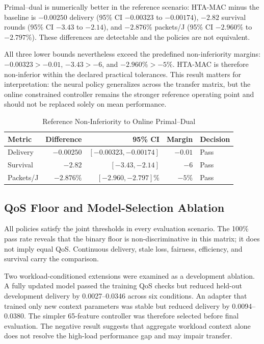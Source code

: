 \documentclass[journal]{IEEEtran}
\newcommand{\method}{HTA-MAC}
\begin{document}
Primal--dual is numerically better in the reference scenario: \method{} minus
the baseline is $-0.00250$ delivery (95\% CI $-0.00323$ to $-0.00174$),
$-2.82$ survival rounds (95\% CI $-3.43$ to $-2.14$), and $-2.876$\%
packets/J (95\% CI $-2.960$\% to $-2.797$\%). These differences are detectable
and the policies are not equivalent.

All three lower bounds nevertheless exceed the predefined non-inferiority margins:
$-0.00323>-0.01$, $-3.43>-6$, and $-2.960\%>-5\%$. \method{} is therefore
non-inferior within the declared practical tolerances. This result matters for
interpretation: the neural policy generalizes across the transfer matrix, but
the online constrained controller remains the stronger reference operating
point and should not be replaced solely on mean performance.

\begin{table}[t]
\centering
\caption{Reference Non-Inferiority to Online Primal--Dual}
\label{tab:noninferiority}
\scriptsize
\begin{tabular}{@{}lrrrl@{}}
\toprule
Metric & Difference & 95\% CI & Margin & Decision \\
\midrule
Delivery & $-0.00250$ & $[-0.00323,-0.00174]$ & $-0.01$ & Pass \\
Survival & $-2.82$ & $[-3.43,-2.14]$ & $-6$ & Pass \\
Packets/J & $-2.876\%$ & $[-2.960,-2.797]\%$ & $-5\%$ & Pass \\
\bottomrule
\end{tabular}
\end{table}

\subsection{QoS Floor and Model-Selection Ablation}

All policies satisfy the joint thresholds in every evaluation scenario.
The 100\% pass rate reveals that the binary floor is non-discriminative in this
matrix; it does not imply equal QoS. Continuous delivery, stale loss, fairness,
efficiency, and survival carry the comparison.

Two workload-conditioned extensions were examined as a development ablation.
A fully updated model passed the training QoS checks but reduced held-out
development delivery by 0.0027--0.0346 across six conditions. An adapter that
trained only new context parameters was stable but reduced delivery by
0.0094--0.0380. The simpler 65-feature controller was therefore selected before
final evaluation. The negative result suggests that aggregate workload context
alone does not resolve the high-load performance gap and may impair transfer.
\end{document}
